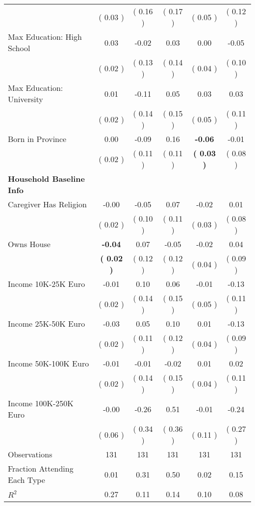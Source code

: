 \begin{table}[H]
{\begin{tabular}{lccccc}
\quad  & (     0.03 ) & (     0.16 )  & (     0.17 )  & (     0.05 ) & (     0.12 ) \\
\quad Max Education: High School &      0.03 &     -0.02 &      0.03 &      0.00 &     -0.05 \\
\quad  & (     0.02 ) & (     0.13 )  & (     0.14 )  & (     0.04 ) & (     0.10 ) \\
\quad Max Education: University &      0.01 &     -0.11 &      0.05 &      0.03 &      0.03 \\
\quad  & (     0.02 ) & (     0.14 )  & (     0.15 )  & (     0.05 ) & (     0.11 ) \\
\quad Born in Province &      0.00 &     -0.09 &      0.16 & \textbf{    -0.06} &     -0.01 \\
\quad  & (     0.02 ) & (     0.11 )  & (     0.11 )  & \textbf{(     0.03 )} & (     0.08 ) \\
\midrule
\textbf{Household Baseline Info} \\
\quad Caregiver Has Religion &     -0.00 &     -0.05 &      0.07 &     -0.02 &      0.01 \\
\quad  & (     0.02 ) & (     0.10 )  & (     0.11 )  & (     0.03 ) & (     0.08 ) \\
\quad Owns House & \textbf{    -0.04} &      0.07 &     -0.05 &     -0.02 &      0.04 \\
\quad  & \textbf{(     0.02 )} & (     0.12 )  & (     0.12 )  & (     0.04 ) & (     0.09 ) \\
\quad Income 10K-25K Euro &     -0.01 &      0.10 &      0.06 &     -0.01 &     -0.13 \\
\quad  & (     0.02 ) & (     0.14 )  & (     0.15 )  & (     0.05 ) & (     0.11 ) \\
\quad Income 25K-50K Euro &     -0.03 &      0.05 &      0.10 &      0.01 &     -0.13 \\
\quad  & (     0.02 ) & (     0.11 )  & (     0.12 )  & (     0.04 ) & (     0.09 ) \\
\quad Income 50K-100K Euro &     -0.01 &     -0.01 &     -0.02 &      0.01 &      0.02 \\
\quad  & (     0.02 ) & (     0.14 )  & (     0.15 )  & (     0.04 ) & (     0.11 ) \\
\quad Income 100K-250K Euro &     -0.00 &     -0.26 &      0.51 &     -0.01 &     -0.24 \\
\quad  & (     0.06 ) & (     0.34 )  & (     0.36 )  & (     0.11 ) & (     0.27 ) \\
\midrule
Observations & 131 & 131 & 131 & 131 & 131 \\
Fraction Attending Each Type &      0.01 &      0.31 &      0.50 &      0.02 &      0.15 \\
\midrule
$ R^2$ &      0.27 &      0.11 &      0.14 &      0.10 &      0.08 \\
\bottomrule
\end{tabular}}
\end{table}
